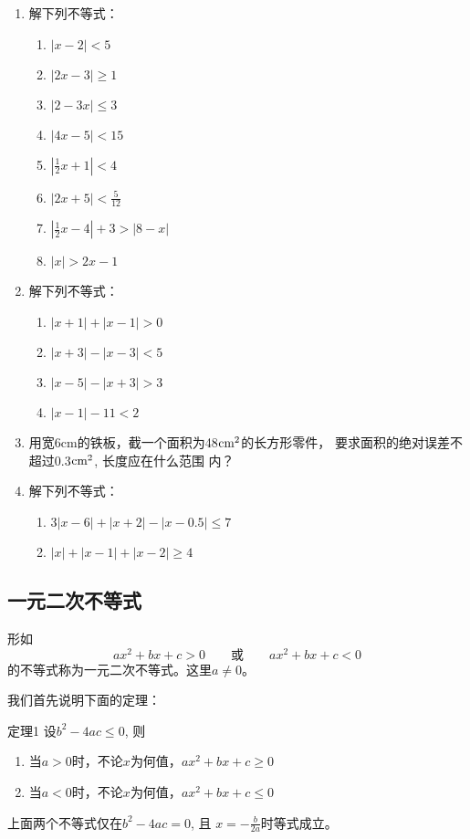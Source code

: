 \begin{ex}
\begin{enumerate}
    \item 解下列不等式：
\begin{multicols}{2}
\begin{enumerate}
    \item $|x-2|<5$
    \item $|2x-3|\ge 1$
    \item $|2-3x|\le 3$
    \item $|4x-5|<15$
    \item $\left|\frac{1}{2}x+1\right|<4$
    \item $|2x+5|<\frac{5}{12}$
    \item $\left|\frac{1}{2}x-4\right|+3>|8-x|$
    \item $|x|>2x-1$
\end{enumerate}    
\end{multicols}

\item 解下列不等式：
\begin{multicols}{2}
\begin{enumerate}
    \item $|x+1|+|x-1|>0$
    \item $|x+3|-|x-3|<5$
    \item $|x-5|-|x+3|>3$
    \item $|x-1|-11<2$
\end{enumerate}
\end{multicols}
\item 用宽6cm的铁板，截一个面积为48${\rm cm}^2$的长方形零件，
要求面积的绝对误差不超过0.3${\rm cm}^2$, 长度应在什么范围
内？
\item 解下列不等式：
\begin{enumerate}
    \item $3|x-6|+|x+2|-|x-0.5|\le 7$
    \item $|x|+|x-1|+|x-2|\ge 4$
\end{enumerate}
\end{enumerate}
\end{ex}

\subsection{一元二次不等式}
形如
\[ax^2+bx+c>0 \qquad \text{或}\qquad  ax^2+bx+c<0 \]
的不等式称为一元二次不等式。这里$a\ne 0$。

我们首先说明下面的定理：
\begin{blk}{定理1}
    设$b^2-4ac\le 0$, 则
\begin{enumerate}
    \item 当$a>0$时，不论$x$为何值，$ax^2+bx+c\ge 0$
    \item 当$a<0$时，不论$x$为何值，$ax^2+bx+c\le 0$
\end{enumerate} 
上面两个不等式仅在$b^2-4ac=0$, 且
$x=-\frac{b}{2a}$时等式成立。
\end{blk}

